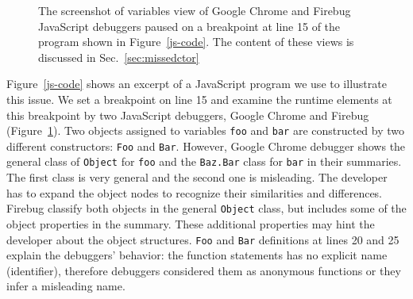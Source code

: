 \documentclass[10pt, preprint]{sigplanconf}
\begin{document}
\begin{figure}[htp]
\centerline{
\hfil
{}}
\caption{The screenshot of variables view of Google Chrome and Firebug JavaScript debuggers paused on a breakpoint at line 15 of the program shown in Figure~\ref{js-code}. The content of these views is discussed in Sec.~\ref{sec:missedctor} }
\label{debuggers-objects}
\end{figure}


Figure~\ref{js-code} shows an excerpt of a JavaScript program we use to illustrate this issue. We set a breakpoint on line 15 and examine the runtime elements at this breakpoint by two JavaScript debuggers, Google Chrome and Firebug (Figure~\ref{debuggers-objects}). Two objects assigned to variables \verb|foo| and \verb|bar| are constructed by two different constructors: \verb|Foo| and \verb|Bar|. However, Google Chrome debugger shows the general class of \verb|Object| for \verb|foo| and the \verb|Baz.Bar| class for \verb|bar| in their summaries. The first class is very general and the second one is misleading. The developer has to expand the object nodes to recognize their similarities and differences. Firebug classify both objects in the general \verb|Object| class, but includes some of the object properties in the summary. These additional properties may hint the developer about the object structures. \verb|Foo| and \verb|Bar| definitions at lines 20 and 25 explain the debuggers' behavior: the function statements has no explicit name (identifier), therefore debuggers considered them as anonymous functions or they infer a misleading name.
 
\end{document}
